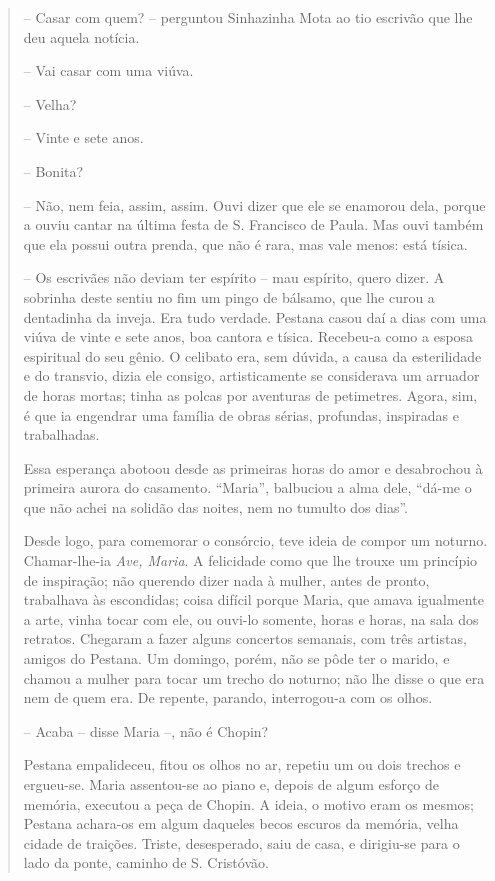 \begin{quote}
-- Casar com quem? -- perguntou Sinhazinha Mota ao tio escrivão que lhe
deu aquela notícia.

-- Vai casar com uma viúva.

-- Velha?

-- Vinte e sete anos.

-- Bonita?

-- Não, nem feia, assim, assim. Ouvi dizer que ele se enamorou dela,
porque a ouviu cantar na última festa de S. Francisco de Paula. Mas ouvi
também que ela possui outra prenda, que não é rara, mas vale menos: está
tísica.

-- Os escrivães não deviam ter espírito -- mau espírito, quero dizer. A
sobrinha deste sentiu no fim um pingo de bálsamo, que lhe curou a
dentadinha da inveja. Era tudo verdade. Pestana casou daí a dias com uma
viúva de vinte e sete anos, boa cantora e tísica. Recebeu-a como a
esposa espiritual do seu gênio. O celibato era, sem dúvida, a causa da
esterilidade e do transvio, dizia ele consigo, artisticamente se
considerava um arruador de horas mortas; tinha as polcas por aventuras
de petimetres. Agora, sim, é que ia engendrar uma família de obras
sérias, profundas, inspiradas e trabalhadas.

Essa esperança abotoou desde as primeiras horas do amor e desabrochou à
primeira aurora do casamento. ``Maria'', balbuciou a alma dele, ``dá-me
o que não achei na solidão das noites, nem no tumulto dos dias''.

Desde logo, para comemorar o consórcio, teve ideia de compor um noturno.
Chamar-lhe-ia \emph{Ave, Maria}. A felicidade como que lhe trouxe um
princípio de inspiração; não querendo dizer nada à mulher, antes de
pronto, trabalhava às escondidas; coisa difícil porque Maria, que amava
igualmente a arte, vinha tocar com ele, ou ouvi-lo somente, horas e
horas, na sala dos retratos. Chegaram a fazer alguns concertos semanais,
com três artistas, amigos do Pestana. Um domingo, porém, não se pôde ter
o marido, e chamou a mulher para tocar um trecho do noturno; não lhe
disse o que era nem de quem era. De repente, parando, interrogou-a com
os olhos.

-- Acaba -- disse Maria --, não é Chopin?

Pestana empalideceu, fitou os olhos no ar, repetiu um ou dois trechos e
ergueu-se. Maria assentou-se ao piano e, depois de algum esforço de
memória, executou a peça de Chopin. A ideia, o motivo eram os mesmos;
Pestana achara-os em algum daqueles becos escuros da memória, velha
cidade de traições. Triste, desesperado, saiu de casa, e dirigiu-se para
o lado da ponte, caminho de S. Cristóvão.


\end{quote}
